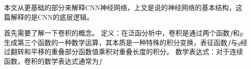 


本文从更基础的部分来解释CNN神经网络，上文是说的神经网络的基本结构，这篇解释的是CNN的底层逻辑。
 
首先需要了解一下卷积的概念。
定义：在泛函分析中，卷积是通过两个函数$f$和$g$生成第三个函数的一种数学运算，其本质是一种特殊的积分变换，表征函数$f$与$g$经过翻转和平移的重叠部分函数值乘积对重叠长度的积分。
数学表达式：对于连续函数，卷积的数学表达式通常为$f$
​
